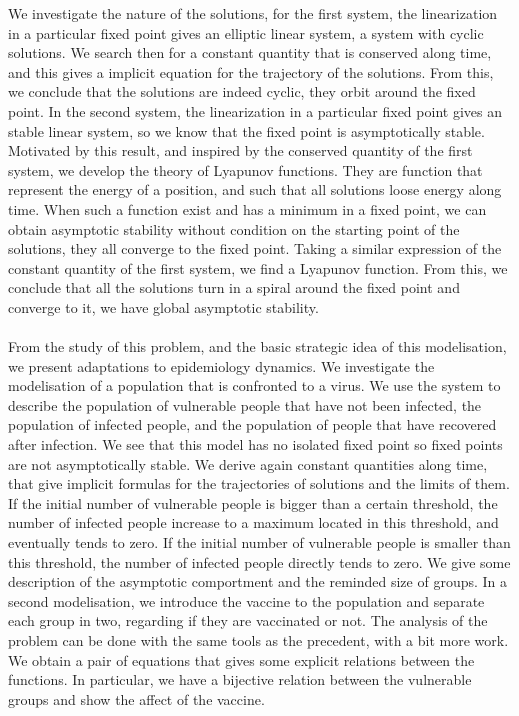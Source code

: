 We investigate the nature of the solutions, for the first system, the linearization in a particular fixed point gives an elliptic linear system, a system with cyclic solutions. We search then for a constant quantity that is conserved along time, and this gives a implicit equation for the trajectory of the solutions. From this, we conclude that the solutions are indeed cyclic, they orbit around the fixed point. In the second system, the linearization in a particular fixed point gives an stable linear system, so we know that the fixed point is asymptotically stable. Motivated by this result, and inspired by the conserved quantity of the first system, we develop the theory of Lyapunov functions. They are function that represent the energy of a position, and such that all solutions loose energy along time. When such a function exist and has a minimum in a fixed point, we can obtain asymptotic stability without condition on the starting point of the solutions, they all converge to the fixed point. Taking a similar expression of the constant quantity of the first system, we find a Lyapunov function. From this, we conclude that all the solutions turn in a spiral around the fixed point and converge to it, we have global asymptotic stability.
\\ \\
From the study of this problem, and the basic strategic idea of this modelisation, we present adaptations to epidemiology dynamics. We investigate the modelisation of a population that is confronted to a virus. We use the \LV system to describe the population of vulnerable people that have not been infected, the population of infected people, and the population of people that have recovered after infection. We see that this model has no isolated fixed point so fixed points are not asymptotically stable. We derive again constant quantities along time, that give implicit formulas for the trajectories of solutions and the limits of them. If the initial number of vulnerable people is bigger than a certain threshold, the number of infected people increase to a maximum located in this threshold, and eventually tends to zero. If the initial number of vulnerable people is smaller than this threshold, the number of infected people directly tends to zero. We give some description of the asymptotic comportment and the reminded size of groups.
In a second modelisation, we introduce the vaccine to the population and separate each group in two, regarding if they are vaccinated or not. The analysis of the problem can be done with the same tools as the precedent, with a bit more work. We obtain a pair of equations that gives some explicit relations between the functions. In particular, we have a bijective relation between the vulnerable groups and show the affect of the vaccine.
\thispagestyle{plain}
